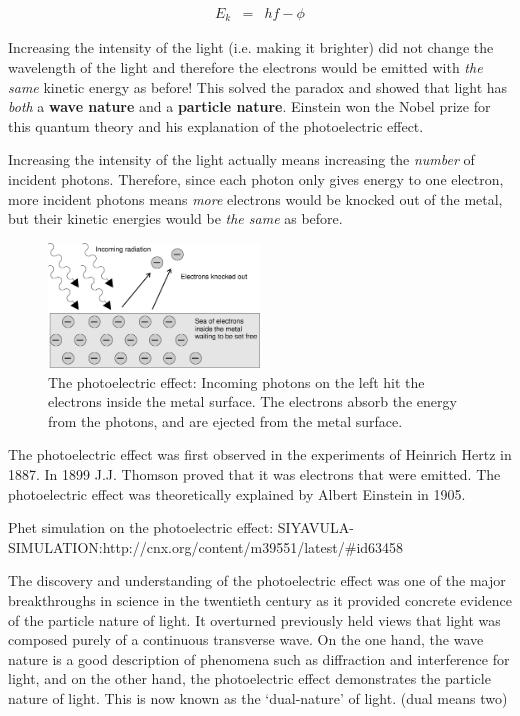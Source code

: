 \begin{eqnarray*}
E_{k} &=& hf - \phi 
\end{eqnarray*} 

Increasing the intensity of the light (i.e. making it brighter) did not change the wavelength of the light and therefore the electrons would be emitted with \textit{the same} kinetic energy as before! This solved the paradox and showed that light has \textit{both} a \textbf{wave nature} and a \textbf{particle nature}. Einstein won the Nobel prize for this quantum theory and his explanation of the photoelectric effect. 

Increasing the intensity of the light actually means increasing the \textit{number} of incident photons. Therefore, since each photon only gives energy to one electron, more incident photons means \textit{more} electrons would be knocked out of the metal, but their kinetic energies would be \textit{the same} as before. 

\begin{figure}[!h]
\begin{center}
\includegraphics[width=0.5\textwidth]{../../epsimages/Photoelectric_effect.eps}
\caption{The photoelectric effect: Incoming photons on the left hit the electrons inside the metal surface. The electrons absorb the energy from the photons, and are ejected from the metal surface.}
\label{phot_el}
\end{center}
\end{figure}

\begin{IFact}
{The photoelectric effect was first observed in the experiments of Heinrich Hertz in 1887. In 1899 J.J. Thomson proved that it was electrons that were emitted. The photoelectric effect was theoretically explained by Albert Einstein in 1905.}
\end{IFact}
Phet simulation on the photoelectric effect: SIYAVULA-SIMULATION:http://cnx.org/content/m39551/latest/#id63458

 
The discovery and understanding of the photoelectric effect was one of the major breakthroughs in science in the twentieth century as it provided concrete evidence of the particle nature of light. It overturned previously held views that light was composed purely of a continuous transverse wave. On the one hand, the wave nature is a good description of phenomena such as diffraction and interference for light, and on the other hand, the photoelectric effect demonstrates the particle nature of light. This is now known as the `dual-nature' of light. (dual means two)

